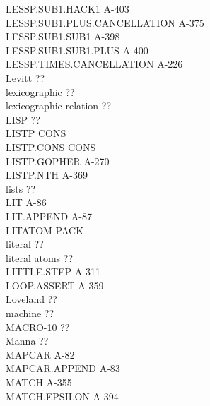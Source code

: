 \documentclass[10pt]{book}
\newenvironment{pubasis}{\begin{flushleft}}{\end{flushleft}}
\begin{document}
\begin{pubasis}
LESSP.SUB1.HACK1                             A-403\\
LESSP.SUB1.PLUS.CANCELLATION                 A-375\\
LESSP.SUB1.SUB1                              A-398\\
LESSP.SUB1.SUB1.PLUS                         A-400\\
LESSP.TIMES.CANCELLATION                     A-226\\
Levitt                                       ??\\
lexicographic                                ??\\
lexicographic relation                       ??\\
LISP                                         ??\\
LISTP                                        CONS\\
LISTP.CONS                                   CONS\\
LISTP.GOPHER                                 A-270\\
LISTP.NTH                                    A-369\\
lists                                        ??\\
LIT                                          A-86\\
LIT.APPEND                                   A-87\\
LITATOM                                      PACK\\
literal                                      ??\\
literal atoms                                ??\\
LITTLE.STEP                                  A-311\\
LOOP.ASSERT                                  A-359\\
Loveland                                     ??\\
machine                                      ??\\
MACRO-10                                     ??\\
Manna                                        ??\\
MAPCAR                                       A-82\\
MAPCAR.APPEND                                A-83\\
MATCH                                        A-355\\
MATCH.EPSILON                                A-394\\

\end{pubasis}
\end{document}
